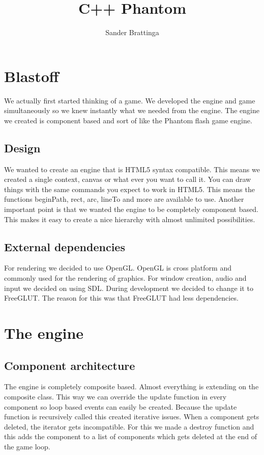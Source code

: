 \documentclass[acmtoplas,acmnow]{acmtrans2m}
\title{C++ Phantom}
\author{Sander Brattinga}
\begin{document}
\begin{bottomstuff}
\end{bottomstuff}

\maketitle
\section{Blastoff}
We actually first started thinking of a game. We developed the engine and game simultaneously so we knew instantly what we needed from the engine. The engine we created is component based and sort of like the Phantom flash game engine. 

\subsection{Design}
We wanted to create an engine that is HTML5 syntax compatible. This means we created a single context, canvas or what ever you want to call it. You can draw things with the same commands you expect to work in HTML5. This means the functions beginPath, rect, arc, lineTo and more are available to use.\newline
Another important point is that we wanted the engine to be completely component based. This makes it easy to create a nice hierarchy with almost unlimited possibilities.

\subsection{External dependencies}
For rendering we decided to use OpenGL. OpenGL is cross platform and commonly used for the rendering of graphics. For window creation, audio and input we decided on using SDL. During development we decided to change it to FreeGLUT. The reason for this was that FreeGLUT had less dependencies.

\newpage
\twocolumn
\section{The engine}

\subsection{Component architecture}
The engine is completely composite based. Almost everything is extending on the composite class. This way we can override the update function in every component so loop based events can easily be created. Because the update function is recursively called this created iterative issues. When a component gets deleted, the iterator gets incompatible. For this we made a destroy function and this adds the component to a list of components which gets deleted at the end of the game loop. 
\end{document}
